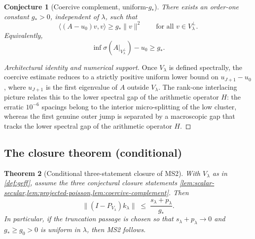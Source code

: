 \documentclass[12pt,a4paper]{article}
\newtheorem{theorem}{Theorem}[section]
\newtheorem{conjecture}[theorem]{Conjecture}
\theoremstyle{definition}
\theoremstyle{remark}
\newcommand{\ip}[2]{\langle #1, #2 \rangle}
\newcommand{\norm}[1]{\| #1 \|}
\begin{document}
\begin{conjecture}[Coercive complement, uniform-$g_*$]
\label{lem:coercive-complement}
There exists an order-one constant $g_* > 0$, independent of
$\lambda$, such that
\[
  \ip{(A-u_0)v}{v} \ge g_* \norm{v}^2
  \qquad\text{for all } v \in V_\lambda^\perp.
\]
Equivalently,
\[
  \inf \sigma(A|_{V_\lambda^\perp}) - u_0 \ge g_*.
\]
\end{conjecture}

\begin{proof}[Architectural identity and numerical support]
Once $V_\lambda$ is defined spectrally, the coercive estimate reduces
to a strictly positive uniform lower bound on $u_{J+1} - u_0$, where
$u_{J+1}$ is the first eigenvalue of $A$ outside $V_\lambda$.  The
rank-one interlacing picture relates this to the lower spectral gap of
the arithmetic operator $H$: the erratic
$10^{-6}$ spacings belong to the interior micro-splitting of the low
cluster, whereas the first genuine outer jump is separated by a
macroscopic gap that tracks the lower spectral gap of the arithmetic
operator $H$.
\end{proof}

\subsection{The closure theorem (conditional)}

\begin{theorem}[Conditional three-statement closure of MS2]
\label{thm:MS2-closure}
With $V_\lambda$ as in \cref{def:geff}, assume the three conjectural
closure statements \cref{lem:scalar-secular,lem:projected-poisson,lem:coercive-complement}.
Then
\begin{equation}
\label{eq:mass-bound}
  \norm{(I - P_{V_\lambda}) k_\lambda}
  \;\leq\; \frac{s_\lambda + p_\lambda}{g_*}.
\end{equation}
In particular, if the truncation passage is chosen so that
$s_\lambda + p_\lambda \to 0$ and $g_* \ge g_0 > 0$ is uniform in
$\lambda$, then MS2 follows.
\end{theorem}
\end{document}
